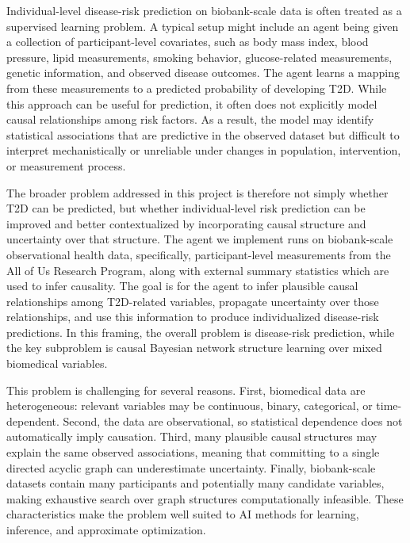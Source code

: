 \documentclass[11pt]{article}
\begin{document}
Individual-level disease-risk prediction on biobank-scale data is often treated as a supervised learning problem. A typical setup might include an agent being given a collection of participant-level covariates, such as body mass index, blood pressure, lipid measurements, smoking behavior, glucose-related measurements, genetic information, and observed disease outcomes. The agent learns a mapping from these measurements to a predicted probability of developing T2D. While this approach can be useful for prediction, it often does not explicitly model causal relationships among risk factors. As a result, the model may identify statistical associations that are predictive in the observed dataset but difficult to interpret mechanistically or unreliable under changes in population, intervention, or measurement process.

The broader problem addressed in this project is therefore not simply whether T2D can be predicted, but whether individual-level risk prediction can be improved and better contextualized by incorporating causal structure and uncertainty over that structure. The agent we implement runs on biobank-scale observational health data, specifically, participant-level measurements from the All of Us Research Program, along with external summary statistics which are used to infer causality. The goal is for the agent to infer plausible causal relationships among T2D-related variables, propagate uncertainty over those relationships, and use this information to produce individualized disease-risk predictions. In this framing, the overall problem is disease-risk prediction, while the key subproblem is causal Bayesian network structure learning over mixed biomedical variables.

This problem is challenging for several reasons. First, biomedical data are heterogeneous: relevant variables may be continuous, binary, categorical, or time-dependent. Second, the data are observational, so statistical dependence does not automatically imply causation. Third, many plausible causal structures may explain the same observed associations, meaning that committing to a single directed acyclic graph can underestimate uncertainty. Finally, biobank-scale datasets contain many participants and potentially many candidate variables, making exhaustive search over graph structures computationally infeasible. These characteristics make the problem well suited to AI methods for learning, inference, and approximate optimization.
\end{document}
